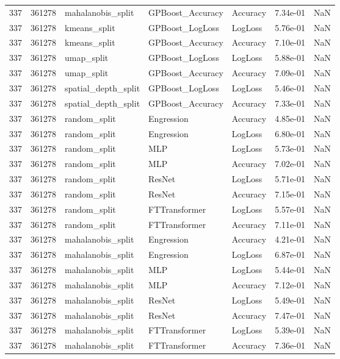 \begin{tabular}{rrlllrr}
337 & 361278 & mahalanobis\_split & GPBoost\_Accuracy & Accuracy & 7.34e-01 & NaN \\
337 & 361278 & kmeans\_split & GPBoost\_LogLoss & LogLoss & 5.76e-01 & NaN \\
337 & 361278 & kmeans\_split & GPBoost\_Accuracy & Accuracy & 7.10e-01 & NaN \\
337 & 361278 & umap\_split & GPBoost\_LogLoss & LogLoss & 5.88e-01 & NaN \\
337 & 361278 & umap\_split & GPBoost\_Accuracy & Accuracy & 7.09e-01 & NaN \\
337 & 361278 & spatial\_depth\_split & GPBoost\_LogLoss & LogLoss & 5.46e-01 & NaN \\
337 & 361278 & spatial\_depth\_split & GPBoost\_Accuracy & Accuracy & 7.33e-01 & NaN \\
337 & 361278 & random\_split & Engression & Accuracy & 4.85e-01 & NaN \\
337 & 361278 & random\_split & Engression & LogLoss & 6.80e-01 & NaN \\
337 & 361278 & random\_split & MLP & LogLoss & 5.73e-01 & NaN \\
337 & 361278 & random\_split & MLP & Accuracy & 7.02e-01 & NaN \\
337 & 361278 & random\_split & ResNet & LogLoss & 5.71e-01 & NaN \\
337 & 361278 & random\_split & ResNet & Accuracy & 7.15e-01 & NaN \\
337 & 361278 & random\_split & FTTransformer & LogLoss & 5.57e-01 & NaN \\
337 & 361278 & random\_split & FTTransformer & Accuracy & 7.11e-01 & NaN \\
337 & 361278 & mahalanobis\_split & Engression & Accuracy & 4.21e-01 & NaN \\
337 & 361278 & mahalanobis\_split & Engression & LogLoss & 6.87e-01 & NaN \\
337 & 361278 & mahalanobis\_split & MLP & LogLoss & 5.44e-01 & NaN \\
337 & 361278 & mahalanobis\_split & MLP & Accuracy & 7.12e-01 & NaN \\
337 & 361278 & mahalanobis\_split & ResNet & LogLoss & 5.49e-01 & NaN \\
337 & 361278 & mahalanobis\_split & ResNet & Accuracy & 7.47e-01 & NaN \\
337 & 361278 & mahalanobis\_split & FTTransformer & LogLoss & 5.39e-01 & NaN \\
337 & 361278 & mahalanobis\_split & FTTransformer & Accuracy & 7.36e-01 & NaN \\

\end{tabular}
